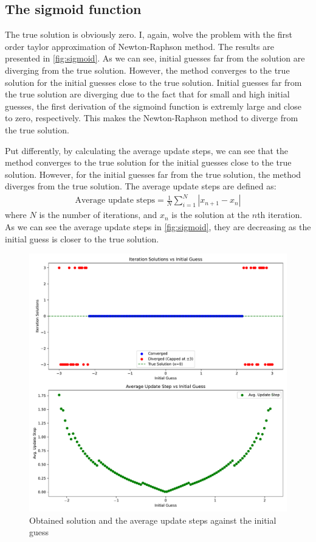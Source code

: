 \documentclass[a4paper,10pt,american]{article}
\begin{document}
\subsection{The sigmoid function}

The true solution is obviously zero. I, again, wolve the problem with the first order taylor approximation of Newton-Raphson method. The results are presented in \autoref{fig:sigmoid}. As we can see, initial guesses far from the solution are diverging from the true solution. However, the method converges to the true solution for the initial guesses close to the true solution. Initial guesses far from the true solution are diverging due to the fact that for small and high initial guesses, the first derivation of the sigmoind function is extremly large and close to zero, respectively. This makes the Newton-Raphson method to diverge from the true solution.

Put differently, by calculating the average update steps, we can see that the method converges to the true solution for the initial guesses close to the true solution. However, for the initial guesses far from the true solution, the method diverges from the true solution. The average update steps are defined as:
\begin{align}
    \text{Average update steps} = \frac{1}{N} \sum_{i=1}^{N} \left| x_{n+1} - x_{n} \right|
\end{align}
where $N$ is the number of iterations, and $x_{n}$ is the solution at the $n$th iteration. As we can see the average update steps in \autoref{fig:sigmoid}, they are decreasing as the initial guess is closer to the true solution.

\begin{figure}[H]
\centering
\includegraphics[width=1\linewidth]{../Plots/NR_sigmoid.pdf}
\caption{Obtained solution and the average update steps against the initial guess}
\label{fig:sigmoid}
\end{figure}
\end{document}
